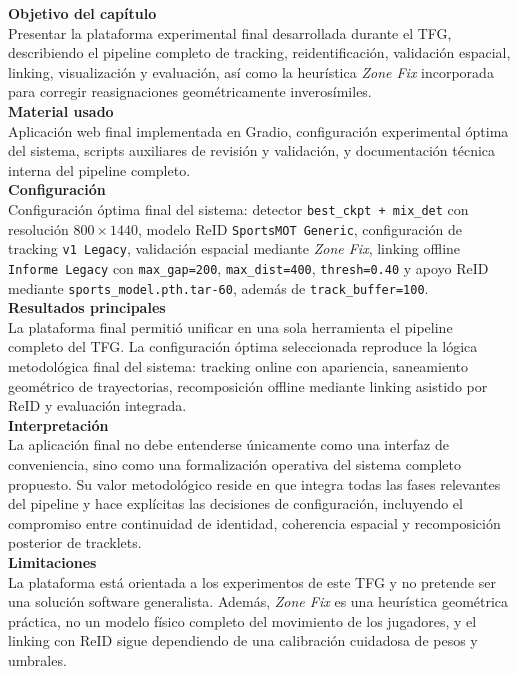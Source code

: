 \documentclass[../MAIN.tex]{subfiles}
\begin{document}
	\begin{chaptertemplatebox}
		\textbf{Objetivo del capítulo}\\
		Presentar la plataforma experimental final desarrollada durante el TFG, describiendo el pipeline completo de tracking, reidentificación, validación espacial, linking, visualización y evaluación, así como la heurística \textit{Zone Fix} incorporada para corregir reasignaciones geométricamente inverosímiles.\\[0.5em]
		
		\textbf{Material usado}\\
		Aplicación web final implementada en Gradio, configuración experimental óptima del sistema, scripts auxiliares de revisión y validación, y documentación técnica interna del pipeline completo.\\[0.5em]
		
		\textbf{Configuración}\\
		Configuración óptima final del sistema: detector \texttt{best\_ckpt + mix\_det} con resolución \(800\times1440\), modelo ReID \texttt{SportsMOT Generic}, configuración de tracking \texttt{v1 Legacy}, validación espacial mediante \textit{Zone Fix}, linking offline \texttt{Informe Legacy} con \texttt{max\_gap=200}, \texttt{max\_dist=400}, \texttt{thresh=0.40} y apoyo ReID mediante \texttt{sports\_model.pth.tar-60}, además de \texttt{track\_buffer=100}.\\[0.5em]
		
		\textbf{Resultados principales}\\
		La plataforma final permitió unificar en una sola herramienta el pipeline completo del TFG. La configuración óptima seleccionada reproduce la lógica metodológica final del sistema: tracking online con apariencia, saneamiento geométrico de trayectorias, recomposición offline mediante linking asistido por ReID y evaluación integrada.\\[0.5em]
		
		\textbf{Interpretación}\\
		La aplicación final no debe entenderse únicamente como una interfaz de conveniencia, sino como una formalización operativa del sistema completo propuesto. Su valor metodológico reside en que integra todas las fases relevantes del pipeline y hace explícitas las decisiones de configuración, incluyendo el compromiso entre continuidad de identidad, coherencia espacial y recomposición posterior de tracklets.\\[0.5em]
		
		\textbf{Limitaciones}\\
		La plataforma está orientada a los experimentos de este TFG y no pretende ser una solución software generalista. Además, \textit{Zone Fix} es una heurística geométrica práctica, no un modelo físico completo del movimiento de los jugadores, y el linking con ReID sigue dependiendo de una calibración cuidadosa de pesos y umbrales.\\[0.5em]
		

\end{chaptertemplatebox}
\end{document}
